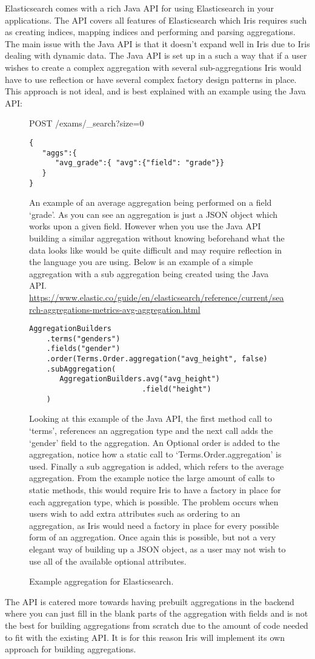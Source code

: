 \documentclass[12pt,a4paper,titlepage]{report}
\begin{document}
Elasticsearch comes with a rich Java API for using Elasticsearch in your applications. The API covers all features of Elasticsearch which Iris requires such as creating indices, mapping indices and performing and parsing aggregations. The main issue with the Java API is that it doesn't expand well in Iris due to Iris dealing with dynamic data. The Java API is set up in a such a way that if a user wishes to create a complex aggregation with several sub-aggregations Iris would have to  use reflection or have several complex factory design patterns in place. This approach is not ideal, and is best explained with an example using the Java API:
\begin{figure}[H]
\begin{tcolorbox}
POST /exams/\_search?size=0
\begin{verbatim}
{
   "aggs":{
      "avg_grade":{ "avg":{"field": "grade"}}
   }
}
\end{verbatim}
An example of an average aggregation being performed on a field `grade'. As you can see an aggregation is just a JSON object which works upon a given field.
However when you use the Java API building a similar aggregation without knowing beforehand what the data looks like would be quite difficult and may require reflection in the language you are using. Below is an example of a simple aggregation with a sub aggregation being created using the Java API. \url{https://www.elastic.co/guide/en/elasticsearch/reference/current/search-aggregations-metrics-avg-aggregation.html}

\begin{verbatim}
AggregationBuilders
	.terms("genders")
	.fields("gender")
	.order(Terms.Order.aggregation("avg_height", false)
	.subAggregation(
	   AggregationBuilders.avg("avg_height")
			              .field("height")
	)
\end{verbatim}
Looking at this example of the Java API, the first method call to `terms', references an aggregation type and the next call adds the `gender' field to the aggregation. An Optional order is added to the aggregation, notice how a static call to `Terms.Order.aggregation' is used. Finally a sub aggregation is added, which refers to the average aggregation. From the example notice the large amount of calls to static methods, this would require Iris to have a factory in place for each aggregation type, which is possible. The problem occurs when users wish to add extra attributes such as ordering to an aggregation, as Iris would need a factory in place for every possible form of an aggregation. Once again this is possible, but not a very elegant way of building up a JSON object, as a user may not wish to use all of the available optional attributes.
\end{tcolorbox}
\caption{Example aggregation for Elasticsearch.}
\end{figure}
The API is catered more towards having prebuilt aggregations in the backend where you can just fill in the blank parts of the aggregation with fields and is not the best for building aggregations from scratch due to the amount of code needed to fit with the existing API. It is for this reason Iris will implement its own approach for building aggregations.
\end{document}
